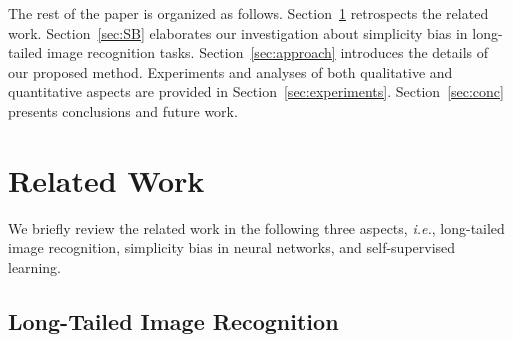 \documentclass[10pt,journal,compsoc]{IEEEtran}
\newcommand{\ie}{\emph{i.e.}}
\begin{document}
The rest of the paper is organized as follows. Section~\ref{sec:related} retrospects the related work. Section~\ref{sec:SB} elaborates our investigation about simplicity bias in long-tailed image recognition tasks. Section~\ref{sec:approach} introduces the details of our proposed method. Experiments and analyses of both qualitative and quantitative aspects are provided in Section~\ref{sec:experiments}. Section~\ref{sec:conc} presents conclusions and future work.

\section{Related Work}\label{sec:related}

We briefly review the related work in the following three aspects, \ie, long-tailed image recognition, simplicity bias in neural networks, and self-supervised learning.

\subsection{Long-Tailed Image Recognition}
\end{document}
